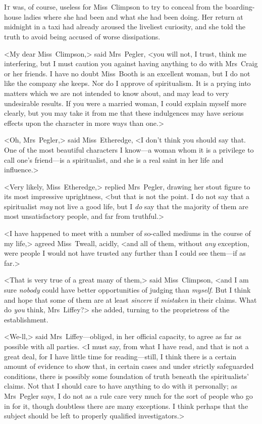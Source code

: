 \chapter[Chapter \thechapter]{}
\lettrine{I}{t} was, of course, useless for Miss~Climpson to try to conceal from the boarding-house ladies where she had been and what she had been doing. Her return at midnight in a taxi had already aroused the liveliest curiosity, and she told the truth to avoid being accused of worse dissipations.

<My dear Miss~Climpson,> said Mrs~Pegler, <you will not, I trust, think me interfering, but I must caution you against having anything to do with Mrs~Craig or her friends. I have no doubt Miss~Booth is an excellent woman, but I do not like the company she keeps. Nor do I approve of spiritualism. It is a prying into matters which we are not intended to know about, and may lead to very undesirable results. If you were a married woman, I could explain myself more clearly, but you may take it from me that these indulgences may have serious effects upon the character in more ways than one.>

<Oh, Mrs~Pegler,> said Miss~Etheredge, <I don't think you should say that. One of the most beautiful characters I know—a woman whom it is a privilege to call one's friend—is a spiritualist, and she is a real saint in her life and influence.>

<Very likely, Miss~Etheredge,> replied Mrs~Pegler, drawing her stout figure to its most impressive uprightness, <but that is not the point. I do not say that a spiritualist \emph{may} not live a good life, but I \emph{do} say that the majority of them are most unsatisfactory people, and far from truthful.>

<I have happened to meet with a number of so-called mediums in the course of my life,> agreed Miss~Tweall, acidly, <and all of them, without \emph{any} exception, were people I would not have trusted any further than I could see them—if as far.>

<That is very true of a great many of them,> said Miss~Climpson, <and I am sure \emph{nobody} could have better opportunities of judging than \emph{myself}. But I think and hope that some of them are at least \emph{sincere} if \emph{mistaken} in their claims. What do \emph{you} think, Mrs~Liffey?> she added, turning to the proprietress of the establishment.

<We-ll,> said Mrs~Liffey—obliged, in her official capacity, to agree as far as possible with all parties. <I must say, from what I have read, and that is not a great deal, for I have little time for reading—still, I think there is a certain amount of evidence to show that, in certain cases and under strictly safeguarded conditions, there is possibly some foundation of truth beneath the spiritualists' claims. Not that I should care to have anything to do with it personally; as Mrs~Pegler says, I do not as a rule care very much for the sort of people who go in for it, though doubtless there are many exceptions. I think perhaps that the subject should be left to properly qualified investigators.>

